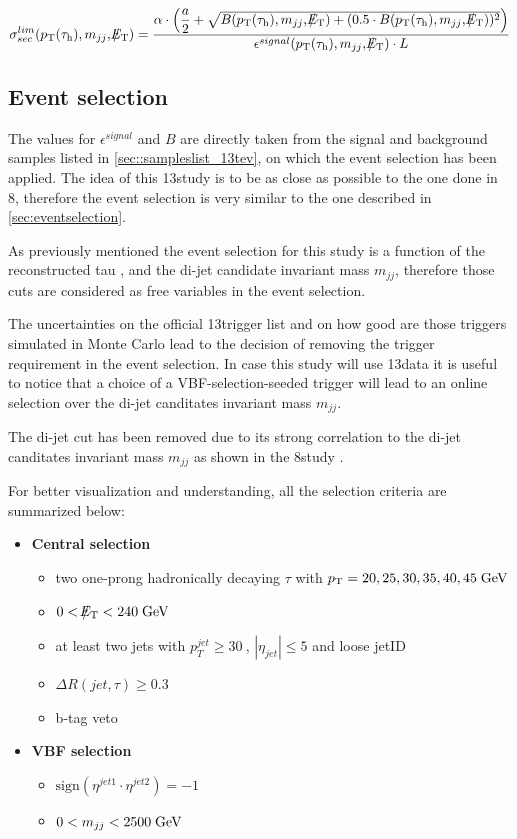 \begin{equation}
\sigma^{lim}_{sec}( \pt(\hadtau) , m_{jj} ,  \met ) = \dfrac{\alpha \cdot\left(\dfrac{a}{2} + \sqrt{B( \pt(\hadtau) , m_{jj} ,  \met ) + (0.5 \cdot B( \pt(\hadtau) , m_{jj} ,  \met ))^{2}}\right)}{\epsilon^{signal} ( \pt(\hadtau) , m_{jj} ,  \met ) \cdot L}
\label{eq::xsec_lim}
\end{equation}



\subsection{Event selection}
\label{subsec::event_sel_13tev}

The values for $\epsilon^{signal}$ and $B$ are directly taken from the signal and background samples listed in \autoref{sec::sampleslist_13tev}, on which the event selection has been applied. The idea of this 13\tev study is to be as close as possible to the one done in 8\tev, therefore the event selection is very similar to the one described in \autoref{sec:eventselection}.

As previously mentioned the event selection for this study is a function of the reconstructed tau \pt , \met and the di-jet candidate invariant mass $m_{jj}$, therefore those cuts are considered as free variables in the event selection. 

The uncertainties on the official 13\tev trigger list and on how good are those triggers simulated in Monte Carlo lead to the decision of removing the trigger requirement in the event selection. In case this study will use 13\tev data it is useful to notice that a choice of a VBF-selection-seeded trigger will lead to an online selection over the di-jet canditates invariant mass $m_{jj}$.

The di-jet \deltaeta cut has been removed due to its strong correlation to the di-jet canditates invariant mass $m_{jj}$ as shown in the 8\tev study \cite{Khachatryan:2015kxa}.

For better visualization and understanding, all the selection criteria are summarized below:

\begin{itemize}
	\item \textbf{Central selection}
	\begin{itemize}
		\item two one-prong hadronically decaying $\tau$ with $p_{\text{T}} = 20,25,30,35,40,45\;\text{Ge}\kern-0.06667em\text{V}$
		\item $0 < \slash\mkern-12mu{E}_{\text{T}} < 240\;\text{Ge}\kern-0.06667em\text{V}$
		\item at least two jets with $p_{T}^{jet}\geq30~$\gev, $|\eta_{jet}|\leq5$ and loose jetID
		\item $\Delta R(jet,\tau)\geq0.3$
		\item b-tag veto
	\end{itemize}
	\item \textbf{VBF selection}
	\begin{itemize}
		\item $\text{sign}(\eta^{jet 1}\cdot\eta^{jet 2})=-1$
		\item $ 0 < m_{jj} < 2500\;\text{Ge}\kern-0.06667em\text{V}$
	\end{itemize}
\end{itemize}

